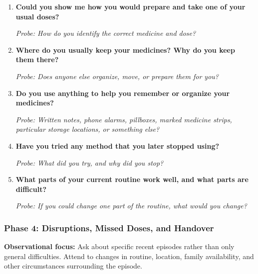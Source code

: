 \begin{enumerate}[resume]
  \item \textbf{Could you show me how you would prepare and take one of your usual doses?}

  \textit{Probe: How do you identify the correct medicine and dose?}
  \item \textbf{Where do you usually keep your medicines? Why do you keep them there?}

  \textit{Probe: Does anyone else organize, move, or prepare them for you?}
  \item \textbf{Do you use anything to help you remember or organize your medicines?}

  \textit{Probe: Written notes, phone alarms, pillboxes, marked medicine strips, particular storage locations, or something else?}
  \item \textbf{Have you tried any method that you later stopped using?}

  \textit{Probe: What did you try, and why did you stop?}
  \item \textbf{What parts of your current routine work well, and what parts are difficult?}

  \textit{Probe: If you could change one part of the routine, what would you change?}
\end{enumerate}

\subsubsection{Phase 4: Disruptions, Missed Doses, and Handover}

\textbf{Observational focus:} Ask about specific recent episodes rather than only general difficulties. Attend to changes in routine, location, family availability, and other circumstances surrounding the episode.

